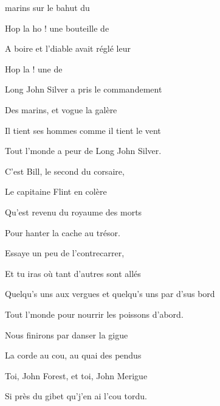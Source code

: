 \begin{SBChorus}
 marins sur le bahut du 

Hop la ho ! une bouteille de 

A boire et l'diable avait r\'egl\'e leur 

Hop la  ! une  de 
\end{SBChorus}

\bigskip

\begin{SBVerse}
Long John Silver a pris le commandement

Des marins, et vogue la gal\`ere

Il tient ses hommes comme il tient le vent

Tout l'monde a peur de Long John Silver.
\end{SBVerse}

\bigskip

C'est Bill, le second du corsaire,

Le capitaine Flint en col\`ere

Qu'est revenu du royaume des morts

Pour hanter la cache au tr\'esor.

\bigskip

Essaye un peu de l'contrecarrer,

Et tu iras o\`u tant d'autres sont all\'es

Quelqu's uns aux vergues et quelqu's uns par d'sus bord

Tout l'monde pour nourrir les poissons d'abord.

\bigskip

Nous finirons par danser la gigue

La corde au cou, au quai des pendus

Toi, John Forest, et toi, John Merigue

Si pr\`es du gibet qu'j'en ai l'cou tordu.
